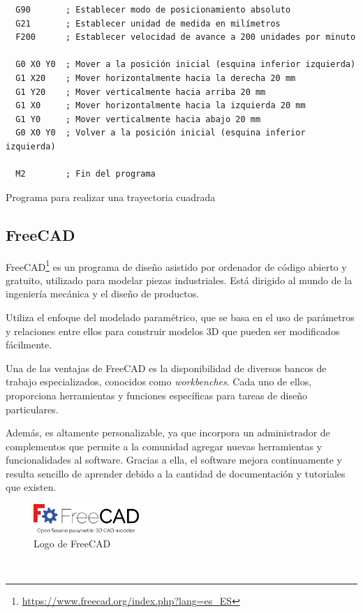 \begin{code}[h]
\begin{verbatim}
  G90       ; Establecer modo de posicionamiento absoluto
  G21       ; Establecer unidad de medida en milímetros
  F200      ; Establecer velocidad de avance a 200 unidades por minuto 
  
  G0 X0 Y0  ; Mover a la posición inicial (esquina inferior izquierda) 
  G1 X20    ; Mover horizontalmente hacia la derecha 20 mm
  G1 Y20    ; Mover verticalmente hacia arriba 20 mm
  G1 X0     ; Mover horizontalmente hacia la izquierda 20 mm
  G1 Y0     ; Mover verticalmente hacia abajo 20 mm
  G0 X0 Y0  ; Volver a la posición inicial (esquina inferior izquierda)
  
  M2        ; Fin del programa
\end{verbatim}
\caption{Programa para realizar una trayectoria cuadrada}
\label{cod:ejemplo_gcode}
\end{code}
\newpage
\subsection{FreeCAD}
\label{subsec:freecad}
\noindent FreeCAD\footnote{\url{https://www.freecad.org/index.php?lang=es_ES}} es un programa de diseño asistido por ordenador de código abierto y gratuito, 
utilizado para modelar piezas industriales.
Está dirigido al mundo de la ingeniería mecánica y el diseño de productos.

Utiliza el enfoque del modelado paramétrico, que se basa 
en el uso de parámetros y relaciones entre ellos para construir modelos 3D que pueden ser 
modificados fácilmente. 

Una de las ventajas de FreeCAD es la disponibilidad de diversos bancos de trabajo especializados, 
conocidos como \textit{workbenches}. Cada uno de ellos, proporciona herramientas y funciones 
específicas para tareas de diseño particulares.

Además, es altamente personalizable, ya que incorpora un administrador de complementos que permite a la comunidad 
agregar nuevas herramientas y funcionalidades al software. Gracias a ella, el software mejora continuamente y 
resulta sencillo de aprender debido a la cantidad de documentación y tutoriales que existen.

\begin{figure} [h!]
  \begin{center}
    \includegraphics[width=4cm]{figs/freecad.png}
  \end{center}
  \caption{Logo de FreeCAD}
  \label{fig:freecadlogo}
\end{figure}\ 
\newpage
